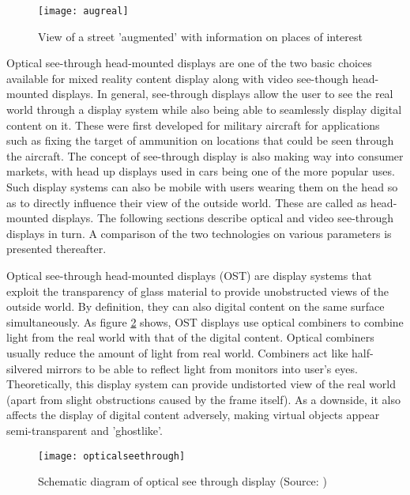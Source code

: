 \begin{figure}
	\centering
	\texttt{[image: augreal]}
	\caption{View of a street 'augmented' with information on places of interest}
	\label{fig:augreal}
\end{figure}


Optical see-through head-mounted displays are one of the two basic choices available for mixed reality content display along with video see-though head-mounted displays. In general, see-through displays allow the user to see the real world through a display system while also being able to seamlessly display digital content on it. These were first developed for military aircraft for applications such as fixing the target of ammunition on locations that could be seen through the aircraft. The concept of see-through display is also making way into consumer markets, with head up displays used in cars being one of the more popular uses. Such display systems can also be mobile with users wearing them on the head so as to directly influence their view of the outside world. These are called as head-mounted displays. The following sections describe optical and video see-through displays in turn. A comparison of the two technologies on various parameters is presented thereafter.

Optical see-through head-mounted displays (OST) are display systems that exploit the transparency of glass material to provide unobstructed views of the outside world. By definition, they can also digital content on the same surface simultaneously. As figure \ref{fig:opticalseethrough} shows, OST displays use optical combiners to combine light from the real world with that of the digital content. Optical combiners usually reduce the amount of light from real world. Combiners act like half-silvered mirrors to be able to reflect light from monitors into user's eyes. Theoretically, this display system can provide undistorted view of the real world (apart from slight obstructions caused by the frame itself). As a downside, it also affects the display of digital content adversely, making virtual objects appear semi-transparent and 'ghostlike'.

\begin{figure}
	\centering
	\texttt{[image: opticalseethrough]}
	\caption{Schematic diagram of optical see through display (Source: \cite{azuma1997survey})}
	\label{fig:opticalseethrough}
\end{figure}

